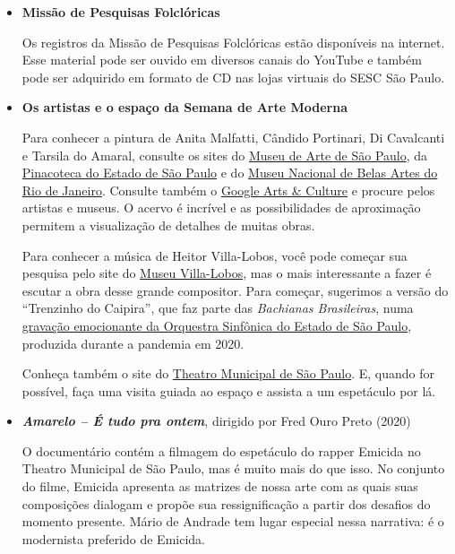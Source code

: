 \documentclass[11pt]{extarticle}
\begin{document}
\begin{itemize}
\item \textbf{Missão de Pesquisas Folclóricas}

Os registros da Missão de Pesquisas Folclóricas estão disponíveis na
internet. Esse material pode ser ouvido em diversos canais do YouTube e
também pode ser adquirido em formato de CD nas lojas virtuais do SESC
São Paulo.

\item \textbf{Os artistas e o espaço da Semana de Arte Moderna}

Para conhecer a pintura de Anita Malfatti, Cândido Portinari, Di
Cavalcanti e Tarsila do Amaral, consulte os sites do \href{https://masp.org.br/}{Museu de Arte de
São Paulo}, da \href{http://pinacoteca.org.br/}{Pinacoteca do Estado de São
Paulo} e do \href{https://mnba.gov.br/}{Museu Nacional de Belas Artes do Rio de Janeiro}. 
Consulte também o \href{https://artsandculture.google.com/}{Google Arts \& Culture} e
procure pelos artistas e museus. O acervo é incrível e as possibilidades
de aproximação permitem a visualização de detalhes de muitas obras.


Para conhecer a música de Heitor Villa-Lobos, você pode começar sua
pesquisa pelo site do \href{https://museuvillalobos.museus.gov.br/}{Museu Villa-Lobos}, 
mas o mais interessante a fazer é escutar a obra desse grande compositor. Para começar,
sugerimos a versão do ``Trenzinho do Caipira'', que faz parte das
\emph{Bachianas Brasileiras}, numa \href{https://youtu.be/KTKVgaY56NI}{gravação emocionante da Orquestra
Sinfônica do Estado de São Paulo}, produzida durante a pandemia em 2020.

Conheça também o site do \href{https://theatromunicipal.org.br/}
{Theatro Municipal de São Paulo}. E, quando for possível, faça uma visita 
guiada ao espaço e assista a um espetáculo por lá.

\item \textbf{\emph{Amarelo -- É tudo pra ontem}}, dirigido por Fred Ouro Preto (2020)

O documentário contém a filmagem do espetáculo do rapper Emicida no
Theatro Municipal de São Paulo, mas é muito mais do que isso. No
conjunto do filme, Emicida apresenta as matrizes de nossa arte com as
quais suas composições dialogam e propõe sua ressignificação a partir
dos desafios do momento presente. Mário de Andrade tem lugar especial
nessa narrativa: é o modernista preferido de Emicida.
\end{itemize}
\end{document}
